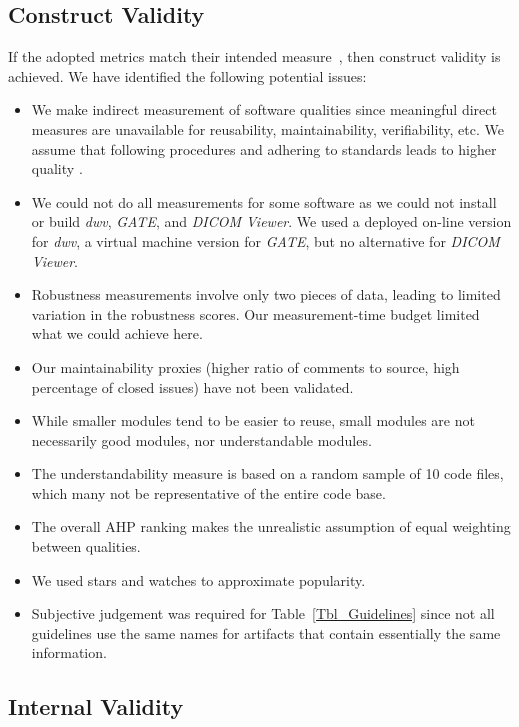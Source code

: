 \documentclass[doubleblind,12pt, 3p, times]{elsarticle}
\begin{document}
\subsection{Construct Validity}

If the adopted metrics match their intended measure~\cite{RunesonAndHost2009},
then construct validity is achieved. We have identified the following potential
issues:
\begin{itemize}
\item We make indirect measurement of software qualities since meaningful direct
measures are unavailable for reusability, maintainability, verifiability, etc.
We assume that following procedures and adhering to standards leads to higher
quality \cite[p.\ 112]{VanVliet2000}.
\item We could not do all measurements for some software as we could not
install or build \textit{dwv}, \textit{GATE}, and \textit{DICOM Viewer}. We
used a deployed on-line version for \textit{dwv}, a virtual machine version for
\textit{GATE}, but no alternative for \textit{DICOM Viewer}.
\item Robustness measurements involve only two pieces of data, leading to
limited variation in the robustness scores. Our measurement-time budget limited
what we could achieve here.
\item Our maintainability proxies (higher ratio of comments to source,
high percentage of closed issues) have not been validated.
\item While smaller modules tend to be easier to reuse, small modules are
not necessarily good modules, nor understandable modules.
\item The understandability measure is based on a random sample of 10 code
files, which many not be representative of the entire code base. 
\item The overall AHP ranking makes the unrealistic assumption of equal
weighting between qualities.
\item We used stars and watches to approximate popularity.
\item Subjective judgement was required for Table~\ref{Tbl_Guidelines} since not
all guidelines use the same names for artifacts that contain essentially the
same information.
\end{itemize}

\subsection{Internal Validity} \label{Sec_InternalValidity}
\end{document}
